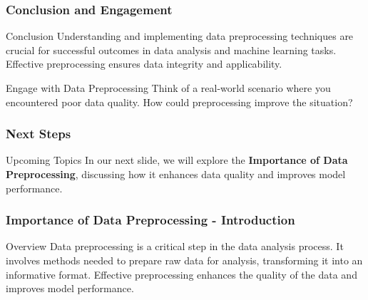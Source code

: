\documentclass[aspectratio=169]{beamer}
\begin{document}
\begin{frame}[fragile]
    \frametitle{Conclusion and Engagement}
    \begin{block}{Conclusion}
        Understanding and implementing data preprocessing techniques are crucial for successful outcomes in data analysis and machine learning tasks. Effective preprocessing ensures data integrity and applicability.
    \end{block}
    
    \begin{block}{Engage with Data Preprocessing}
        Think of a real-world scenario where you encountered poor data quality. How could preprocessing improve the situation?
    \end{block}
\end{frame}

\begin{frame}[fragile]
    \frametitle{Next Steps}
    \begin{block}{Upcoming Topics}
        In our next slide, we will explore the \textbf{Importance of Data Preprocessing}, discussing how it enhances data quality and improves model performance.
    \end{block}
\end{frame}

\begin{frame}[fragile]
    \frametitle{Importance of Data Preprocessing - Introduction}
    \begin{block}{Overview}
        Data preprocessing is a critical step in the data analysis process. It involves methods needed to prepare raw data for analysis, transforming it into an informative format. Effective preprocessing enhances the quality of the data and improves model performance.
    \end{block}
\end{frame}
\end{document}
